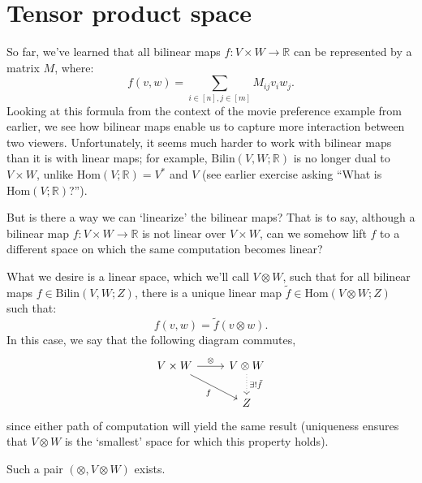 \section{Tensor product space}
So far, we've learned that all bilinear maps $f : V \times W \to
\mathbb{R}$ can be represented by a matrix $M$, where: 
\begin{equation}\label{bilinear-map-representation}
  f(v,w) = \sum_{i \in [n], j \in [m]} M_{ij} v_i w_j.
\end{equation}
Looking at this formula from the context of the movie preference
example from earlier, we  see how bilinear maps enable us to capture
more interaction between two viewers. Unfortunately, it seems much
harder to work with bilinear maps than it is with linear maps; for
example, $\mathrm{Bilin}(V,W;\mathbb{R})$ is no longer dual to $V
\times W$, unlike $\mathrm{Hom}(V;\mathbb{R})=V^{*}$ and $V$ (see
earlier exercise asking ``What is $\mathrm{Hom}(V;\mathbb{R})$?'').  

But is there a way we can `linearize' the bilinear maps? That is to
say, although a bilinear map $f: V \times W \to \mathbb{R}$ is not
linear over $V \times W$, can we somehow lift $f$ to a different space
on which the same computation becomes linear? 

What we desire is a linear space, which we'll call $V \otimes W$, such
that for all bilinear maps $f \in \mathrm{Bilin}(V, W; Z)$, there is a
unique linear map $\tilde{f} \in \mathrm{Hom}(V\otimes W; Z)$ such
that: 
\begin{equation*}
  f(v,w) = \tilde{f}(v\otimes w).
\end{equation*}
In this case, we say that the following diagram commutes,
\[\begin{tikzcd}
V \times W \arrow{r}{\otimes} \arrow[swap]{dr}{f} & V \otimes W
\arrow[dotted]{d}{\exists !\tilde{f}} \\ 
& Z
\end{tikzcd}\]
since either path of computation will yield the same result
(uniqueness ensures that $V \otimes W$ is the `smallest' space for
which this property holds). 

\begin{proposition}
Such a pair $(\otimes, V\otimes W)$ exists. 
\end{proposition}

